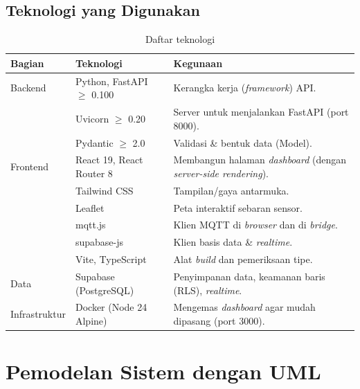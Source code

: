 \documentclass[11pt,a4paper]{article}
\begin{document}
\subsection{Teknologi yang Digunakan}
\begin{table}[H]
\centering
\caption{Daftar teknologi}
\label{tab:teknologi}
\begin{tabularx}{\linewidth}{@{}llL@{}}
\toprule
\textbf{Bagian} & \textbf{Teknologi} & \textbf{Kegunaan} \\
\midrule
Backend      & Python, FastAPI $\geq$ 0.100      & Kerangka kerja (\textit{framework}) API. \\
             & Uvicorn $\geq$ 0.20               & Server untuk menjalankan FastAPI (port 8000). \\
             & Pydantic $\geq$ 2.0               & Validasi \& bentuk data (Model). \\
\midrule
Frontend     & React 19, React Router 8          & Membangun halaman \textit{dashboard} (dengan \textit{server-side rendering}). \\
             & Tailwind CSS                      & Tampilan/gaya antarmuka. \\
             & Leaflet                           & Peta interaktif sebaran sensor. \\
             & mqtt.js                           & Klien MQTT di \textit{browser} dan di \textit{bridge}. \\
             & supabase-js                       & Klien basis data \& \textit{realtime}. \\
             & Vite, TypeScript                  & Alat \textit{build} dan pemeriksaan tipe. \\
\midrule
Data         & Supabase (PostgreSQL)             & Penyimpanan data, keamanan baris (RLS), \textit{realtime}. \\
\midrule
Infrastruktur& Docker (Node 24 Alpine)           & Mengemas \textit{dashboard} agar mudah dipasang (port 3000). \\
\bottomrule
\end{tabularx}
\end{table}

\section{Pemodelan Sistem dengan UML}
\end{document}

